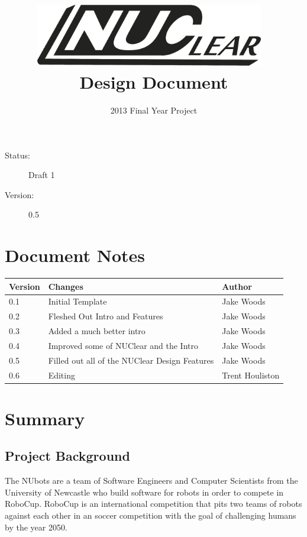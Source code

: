 \documentclass[english,12pt]{scrartcl}
\title{\includegraphics[width=0.75\textwidth]{./Logo/NUClear-logo}~\\[1cm] Design Document}
\author{2013 Final Year Project}
\begin{document}
	\maketitle

	\vfill
	{\large
		\begin{description}
			\item [Status:] Draft 1
			\item [Version:] 0.5
		\end{description}}

	\clearpage
	\tableofcontents

	\section{Document Notes}
		\begin{tabular}{ p{} | p{} | p{} }
			\textbf{Version} & \textbf{Changes} & \textbf{Author} \\
			\hline

			0.1 &
			Initial Template &
			Jake Woods \\
			\hline

			0.2 &
			Fleshed Out Intro and Features &
			Jake Woods \\
			\hline
			
			0.3 &
			Added a much better intro &
			Jake Woods \\
			\hline
			
			0.4 &
			Improved some of NUClear and the Intro &
			Jake Woods \\
			\hline
			
			0.5 &
			Filled out all of the NUClear Design Features &
			Jake Woods \\
			\hline
			
			0.6 &
			Editing &
			Trent Houliston \\
			\hline
		\end{tabular}
		
	\clearpage
		
	\section{Summary}
		\subsection{Project Background}
			The NUbots are a team of Software Engineers and Computer Scientists from the University of Newcastle who build software for robots in order to compete in RoboCup.
			RoboCup is an international competition that pits two teams of robots against each other in an soccer competition with the goal of challenging humans by the year 2050.
			
\end{document}
